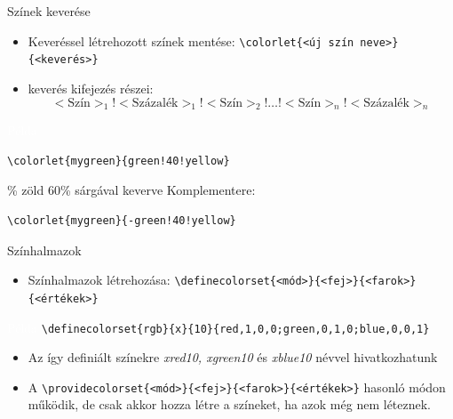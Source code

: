 \documentclass[aspectratio=1610, dvipsnames, xcolor=table]{beamer}
\begin{document}
    \begin{frame}[fragile]{Színek keverése}
        \begin{itemize}
            \item {}Keveréssel létrehozott színek mentése: \verb!\colorlet{<új szín neve>}{<keverés>}!
            \item {}keverés kifejezés részei: $$<\text{Szín}>_1!<\text{Százalék}>_1!<\text{Szín}>_2!\ldots!<\text{Szín}>_n!<\text{Százalék}>_n$$
        \end{itemize}

        \begin{exampleblock}{\textcolor{white}{Példa}}
             \begin{verbatim}\colorlet{mygreen}{green!40!yellow}\end{verbatim} 
            \% zöld 60\% sárgával keverve  
            Komplementere:  \begin{verbatim}\colorlet{mygreen}{-green!40!yellow}\end{verbatim} 
        \end{exampleblock}
    \end{frame}
    

    \begin{frame}[fragile]{Színhalmazok}
        \begin{itemize}
            \item {}Színhalmazok létrehozása: \verb!\definecolorset{<mód>}{<fej>}{<farok>}{<értékek>}!
        \end{itemize}
         \begin{exampleblock}{\textcolor{white}{Példa}}
            \verb!\definecolorset{rgb}{x}{10}{red,1,0,0;green,0,1,0;blue,0,0,1}!
        \end{exampleblock}
            
        \begin{itemize}
            \item {} Az így definiált színekre \textit{xred10, xgreen10} és \textit{xblue10} névvel hivatkozhatunk
            \item {} A \verb!\providecolorset{<mód>}{<fej>}{<farok>}{<értékek>}! hasonló módon működik, de csak akkor hozza létre a színeket, ha azok még nem léteznek.
        \end{itemize}        
    \end{frame}
\end{document}
